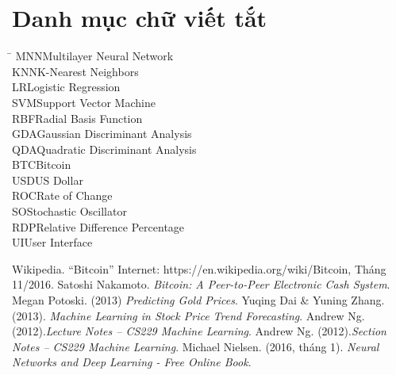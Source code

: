 \documentclass[12pt,a4paper]{report}
\begin{document}
 



\tableofcontents
\pagebreak
\listoffigures
\pagebreak 
\listoftables  
\pagebreak

\chapter*{Danh mục chữ viết tắt}
\thispagestyle{plain} 
\begin{tabbing}
\hspace{3cm}\= \kill
MNN\>Multilayer Neural Network\\
KNN\>K-Nearest Neighbors\\
LR\>Logistic Regression\\
SVM\>Support Vector Machine\\
RBF\>Radial Basis Function\\
GDA\>Gaussian Discriminant Analysis\\
QDA\>Quadratic Discriminant Analysis\\
BTC\>Bitcoin\\
USD\>US Dollar\\
ROC\>Rate of Change\\
SO\>Stochastic Oscillator\\
RDP\>Relative Difference Percentage\\
UI\>User Interface\\

\end{tabbing}

\pagebreak 


 



 
\pagebreak
\begin{thebibliography}{9}

Wikipedia. ``Bitcoin'' Internet: https://en.wikipedia.org/wiki/Bitcoin, Tháng 11/2016.
Satoshi Nakamoto. \emph{Bitcoin: A Peer-to-Peer Electronic Cash System}.
Megan Potoski. (2013) \emph{Predicting Gold Prices}. 
Yuqing Dai \& Yuning Zhang. (2013). \emph{Machine Learning in Stock Price Trend Forecasting}.
Andrew Ng. (2012).\emph{Lecture Notes – CS229 Machine Learning}.
Andrew Ng. (2012).\emph{Section Notes – CS229 Machine Learning}.
Michael Nielsen. (2016, tháng 1). \emph{Neural Networks and Deep Learning - Free Online Book}.
\end{thebibliography}
\end{document}
